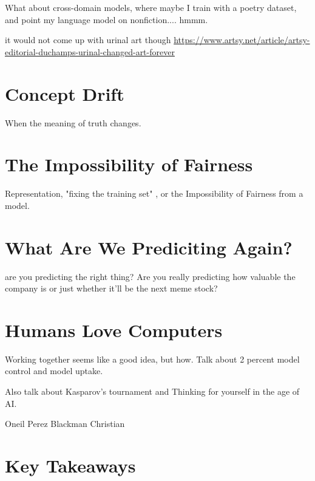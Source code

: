 What about cross-domain models, where maybe I train with a poetry dataset, and point my language model on nonfiction.... hmmm.

it would not come up with urinal art though \url{https://www.artsy.net/article/artsy-editorial-duchamps-urinal-changed-art-forever}

\section{Concept Drift}

When the meaning of truth changes.

\section{The Impossibility of Fairness}

Representation, "fixing the training set" , or the Impossibility of Fairness from a model.

\section{What Are We Prediciting Again?}

are you predicting the right thing? Are you really predicting how valuable the company is or just whether it'll be the next meme stock?

\section{Humans Love Computers}

Working together seems like a good idea, but how. Talk about 2 percent model control and model uptake. 

Also talk about Kasparov's tournament and Thinking for yourself in the age of AI. 

Oneil\cite{Oneil2017}
Perez\cite{Perez2019}
Blackman\cite{Blackman2022Jul}
Christian\cite{Christian2020}

\section{Key Takeaways}

